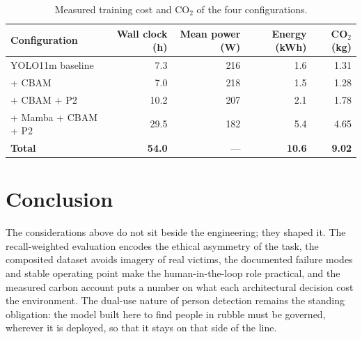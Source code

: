 \begin{table}[tbp]
  \centering
  \caption{Measured training cost and CO$_2$ of the four configurations.}
  \label{tab:carbon}
  \begin{tabular}{@{}l r r r r@{}}
    \toprule
    \textbf{Configuration} & \textbf{Wall clock (h)} & \textbf{Mean power (W)} & \textbf{Energy (kWh)} & \textbf{CO$_2$ (kg)} \\
    \midrule
    YOLO11m baseline    & 7.3  & 216 & 1.6 & 1.31 \\
    + CBAM              & 7.0  & 218 & 1.5 & 1.28 \\
    + CBAM + P2         & 10.2 & 207 & 2.1 & 1.78 \\
    + Mamba + CBAM + P2 & 29.5 & 182 & 5.4 & 4.65 \\
    \midrule
    \textbf{Total}      & \textbf{54.0} & --- & \textbf{10.6} & \textbf{9.02} \\
    \bottomrule
  \end{tabular}
\end{table}

\section{Conclusion}
The considerations above do not sit beside the engineering; they shaped it.
The recall-weighted evaluation encodes the ethical asymmetry of the task, the
composited dataset avoids imagery of real victims, the documented failure
modes and stable operating point make the human-in-the-loop role practical,
and the measured carbon account puts a number on what each architectural
decision cost the environment. The dual-use nature of person detection
remains the standing obligation: the model built here to find people in
rubble must be governed, wherever it is deployed, so that it stays on that
side of the line.
